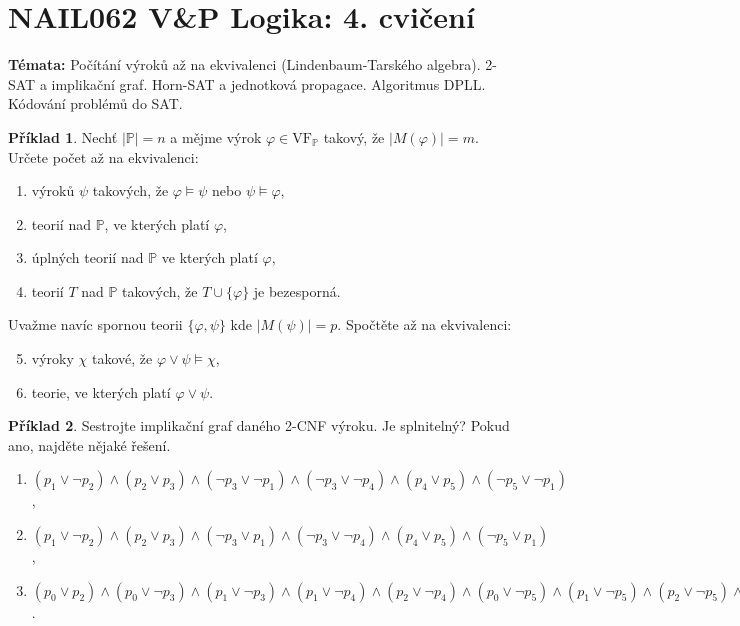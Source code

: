 \documentclass[a4paper]{article}
\theoremstyle{definition}
\newtheorem{problem}{Příklad}
\begin{document}
\section*{NAIL062 V\&P Logika: 4. cvičení}

\textbf{Témata:} 
Počítání výroků až na ekvivalenci (Lindenbaum-Tarského algebra). 2-SAT a implikační graf. Horn-SAT a jednotková propagace. Algoritmus DPLL. Kódování problémů do SAT.


\medskip\begin{problem}
    Nechť $|\mathbb{P}|=n$ a mějme výrok $\varphi\in\mathrm{VF}_{\mathbb{P}}$ takový, že $|M(\varphi)|=m$. Určete počet až na ekvivalenci:
    \begin{enumerate}
    \item výroků $\psi$ takových, že $\varphi \models \psi$ nebo $\psi \models \varphi$,
    \item teorií nad $\mathbb{P}$, ve kterých platí $\varphi$,
    \item úplných teorií nad $\mathbb{P}$ ve kterých platí $\varphi$,
    \item teorií $T$ nad $\mathbb{P}$ takových, že $T \cup \{\varphi\}$ je bezesporná.
    \end{enumerate}
    Uvažme navíc spornou teorii $\{\varphi,\psi\}$ kde $|M(\psi)|=p$. Spočtěte až na ekvivalenci:
    \begin{enumerate}
    \setcounter{enumi}{4}
    \item výroky $\chi$ takové, že $\varphi \vee \psi \models \chi$, 
    \item teorie, ve kterých platí $\varphi \vee \psi$.
    \end{enumerate}
\end{problem}

    
\medskip\begin{problem} Sestrojte implikační graf daného 2-CNF výroku. Je splnitelný? Pokud ano, najděte nějaké řešení.
\begin{enumerate}
    \item $(p_1\vee \neg p_2)\wedge (p_2\vee p_3)\wedge (\neg p_3\vee \neg p_1)\wedge (\neg p_3\vee \neg p_4)\wedge (p_4\vee p_5)\wedge (\neg p_5\vee \neg p_1)$,
    \item $(p_1\vee \neg p_2)\wedge (p_2\vee p_3)\wedge (\neg p_3\vee p_1)\wedge (\neg p_3\vee \neg p_4)\wedge (p_4\vee p_5)\wedge (\neg p_5\vee p_1)$,
    \item $(p_0 \vee  p_2) \wedge  (p_0 \vee  \neg p_3) \wedge  (p_1 \vee  \neg p_3) 
    \wedge  (p_1 \vee  \neg p_4) \wedge  (p_2 \vee  \neg p_4) 
    \wedge  (p_0 \vee  \neg p_5)
    \wedge 
    (p_1 \vee  \neg p_5) \wedge  (p_2 \vee  \neg p_5) \wedge  (\neg p_1 \vee  \neg p_6) \wedge  (p_4 \vee  p_6) \wedge  (p_5 \vee  p_6) \wedge  p_1\wedge \neg p_7$.
\end{enumerate}
\end{problem}
\end{document}
